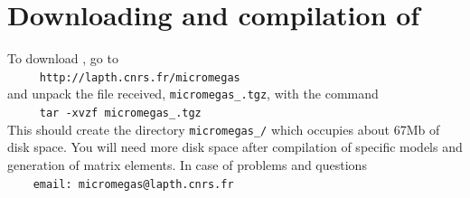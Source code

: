 \documentclass[12pt,a4paper]{article}
\begin{document}
\section{Downloading and compilation of \micro}
To   download  \micro, go to    \\  
\verb|     http://lapth.cnrs.fr/micromegas|\\
and unpack the file received, \verb|micromegas_|\VERSION\verb|.tgz|, with the command\\
\verb|     tar -xvzf micromegas_|\VERSION\verb|.tgz|\\
This should create the directory \verb|micromegas_|\VERSION\verb|/| which occupies about 67Mb of disk space. You will need more disk space after compilation of
specific models and generation of matrix elements.
In case of problems and questions\\
\verb|    email: micromegas@lapth.cnrs.fr|\\
\end{document}
